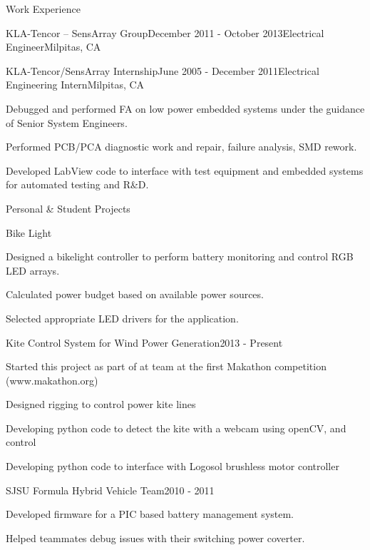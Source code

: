 \documentclass{resume} %
\begin{document}
\begin{rSection}{Work Experience}
\begin{rSubsection}{KLA-Tencor -- SensArray Group}{December 2011 - October 2013}{Electrical Engineer}{Milpitas, CA}
\end{rSubsection}

\pagebreak[2]
\begin{rSubsection}{KLA-Tencor/SensArray Internship}{June 2005 - December 2011}{Electrical Engineering Intern}{Milpitas, CA}
\item Debugged and performed FA on low power embedded systems under the guidance of Senior System Engineers. 
\item Performed PCB/PCA diagnostic work and repair, failure analysis, SMD rework.
\item Developed LabView code to interface with test equipment and embedded systems for automated testing and R\&D.
\end{rSubsection}

\end{rSection}

\pagebreak[3]
\begin{rSection}{Personal \& Student Projects}
\vspace{-0.5em}
\begin{rProject}{Bike Light}{}
\item Designed a bikelight controller to perform battery monitoring and control RGB LED arrays.
\item Calculated power budget based on available power sources.
\item Selected appropriate LED drivers for the application.
\end{rProject}
\vspace{-0.5em}
\begin{rProject}{Kite Control System for Wind Power Generation}{2013 - Present}
\item Started this project as part of at team at the first Makathon competition (www.makathon.org)
\item Designed rigging to control power kite lines 
\item Developing python code to detect the kite with a webcam using openCV, and control 
\item Developing python code to interface with Logosol brushless motor controller
\end{rProject}
\vspace{-0.5em}
\begin{rProject}{SJSU Formula Hybrid Vehicle Team}{2010 - 2011}
\item Developed firmware for a PIC based battery management system.
\item Helped teammates debug issues with their switching power coverter.
\end{rProject}
\end{rSection}
\end{document}
